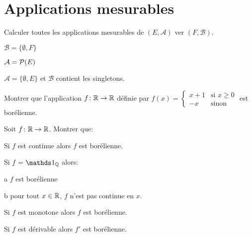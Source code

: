 \documentclass[french]{report}
\begin{document}
\section*{Applications mesurables}

\begin{exo}
    Calculer toutes les applications mesurables de \(\left(E, \mathcal{A}\right)\)
    ver \(\left(F, \mathcal{B}\right)\).
    \begin{q}{1}
        \(\mathcal{B} = \{\emptyset, F\}\)
    \end{q}
    \begin{q}{2}
        \(\mathcal{A}=\pow[E]\)
    \end{q}
    \begin{q}{3}
        \(\mathcal{A} = \{\emptyset, E\}\) et \(\mathcal{B}\) contient les singletons.
    \end{q}
\end{exo}

\begin{exo}
    Montrer que l'application \(f\colon\R\to\R\) définie par
    \(f(x)=\begin{cases}
        x+1&\text{si }x\geq 0\\
        -x&\text{sinon}
    \end{cases}\) est borélienne.
\end{exo}

\begin{exo}
    Soit \(f\colon\R\to\R\). Montrer que:
    \begin{q}{1}
        Si \(f\) est continue alors \(f\) est borélienne.
    \end{q}
    \begin{q}{2}
        Si \(f\) = \(\ind_\Q\) alors:
        \begin{q}{a}
            \(f\) est borélienne
        \end{q}
        \begin{q}{b}
            pour tout \(x\in\R\), \(f\) n'est pas continue en \(x\).
        \end{q}
    \end{q}
    \begin{q}{3}
        Si \(f\) est monotone alors \(f\) est borélienne.
        \boxans{}
    \end{q}
    \begin{q}{4}
        Si \(f\) est dérivable alors \(f'\) est borélienne.
    \end{q}
\end{exo}
\end{document}
